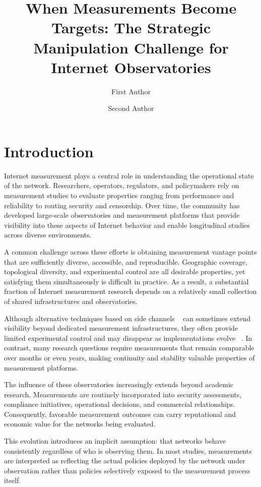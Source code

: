 \documentclass[sigconf, 10pt, anonymous, nonacm]{acmart}
\title{When Measurements Become Targets: The Strategic Manipulation Challenge for Internet Observatories}
\author{First Author}
\affiliation{%
  \institution{First Institution}
  \city{City}
  \country{Country}
}
\author{Second Author}
\affiliation{%
  \institution{Second Institution}
  \city{City}
  \country{Country}
}
\begin{document}
\maketitle

\section{Introduction}

Internet measurement plays a central role in understanding the operational state of the network. Researchers, operators, regulators, and policymakers rely on measurement studies to evaluate properties ranging from performance and reliability to routing security and censorship. Over time, the community has developed large-scale observatories and measurement platforms that provide visibility into these aspects of Internet behavior and enable longitudinal studies across diverse environments.

A common challenge across these efforts is obtaining measurement vantage points that are sufficiently diverse, accessible, and reproducible. Geographic coverage, topological diversity, and experimental control are all desirable properties, yet satisfying them simultaneously is difficult in practice. As a result, a substantial fraction of Internet measurement research depends on a relatively small collection of shared infrastructures and observatories.

Although alternative techniques based on side channels ~\cite{ipid,ipv6} can sometimes extend visibility beyond dedicated measurement infrastructures, they often provide limited experimental control and may disappear as implementations evolve ~\cite{rscope}. In contrast, many research questions require measurements that remain comparable over months or even years, making continuity and stability valuable properties of measurement platforms.

The influence of these observatories increasingly extends beyond academic research. Measurements are routinely incorporated into security assessments, compliance initiatives, operational decisions, and commercial relationships. Consequently, favorable measurement outcomes can carry reputational and economic value for the networks being evaluated.

This evolution introduces an implicit assumption: that networks behave consistently regardless of who is observing them. In most studies, measurements are interpreted as reflecting the actual policies deployed by the network under observation rather than policies selectively exposed to the measurement process itself.
\end{document}
